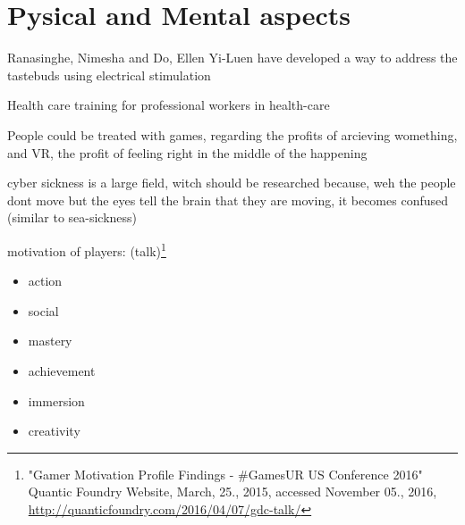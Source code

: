 \section{Pysical and Mental aspects}

Ranasinghe, Nimesha and Do, Ellen Yi-Luen have developed a way to address the tastebuds using electrical stimulation \cite{Ranasinghe:2016:VSS:2984751.2985729}

Health care training for professional workers in health-care

People could be treated with games, regarding the profits of arcieving womething, and VR, the profit of feeling right in the middle of the happening

cyber sickness is a large field, witch should be researched because, weh the people dont move but the eyes tell the brain that they are moving, it becomes confused (similar to sea-sickness)

motivation of players: (talk)\footnote{"Gamer Motivation Profile Findings - \#GamesUR US Conference 2016" Quantic Foundry Website, March, 25., 2015, accessed November 05., 2016, \url{http://quanticfoundry.com/2016/04/07/gdc-talk/}}
\begin{itemize}
	\item action
	\item social
	\item mastery
	\item achievement
	\item immersion
	\item creativity
\end{itemize}

\textcolor{gray}{\blindtext[3]}

